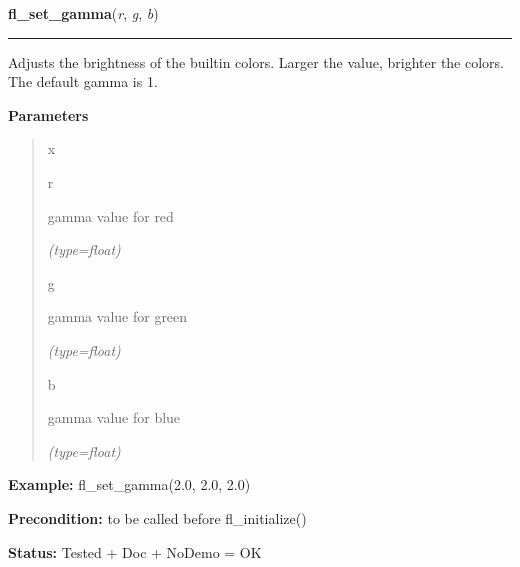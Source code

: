 \hspace{.8\funcindent}\begin{boxedminipage}{\funcwidth}

    \raggedright \textbf{fl\_set\_gamma}(\textit{r}, \textit{g}, \textit{b})

    \vspace{-1.5ex}

    \rule{\textwidth}{0.5\fboxrule}
\setlength{\parskip}{2ex}
    Adjusts the brightness of the builtin colors. Larger the value, 
    brighter the colors. The default gamma is 1.

\setlength{\parskip}{1ex}
      \textbf{Parameters}
      \vspace{-1ex}

      \begin{quote}
        \begin{Ventry}{x}

          \item[r]

          gamma value for red

            {\it (type=float)}

          \item[g]

          gamma value for green

            {\it (type=float)}

          \item[b]

          gamma value for blue

            {\it (type=float)}

        \end{Ventry}

      \end{quote}

\textbf{Example:} fl\_set\_gamma(2.0, 2.0, 2.0)



\textbf{Precondition:} to be called before fl\_initialize()



\textbf{Status:} Tested + Doc + NoDemo = OK



    \end{boxedminipage}

    \label{xformslib:flbasic:FL_max}

    \vspace{0.5ex}

